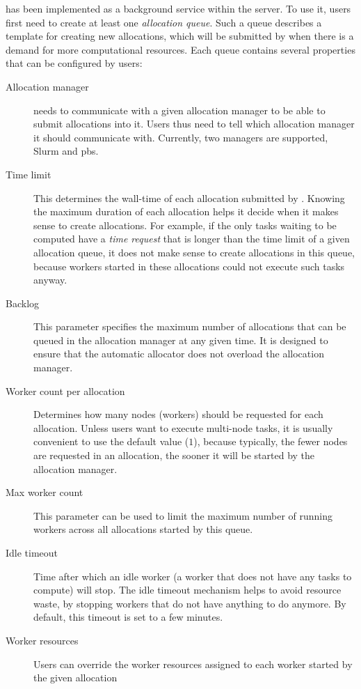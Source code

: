 \Autoalloc{} has been implemented as a background service within the
\hyperqueue{} server. To use it, users first need to create at least one
\emph{allocation queue}. Such a queue describes a template for creating new allocations, which will
be submitted by \hq{} when there is a demand for more computational resources.
Each queue contains several properties that can be configured by users:

\begin{description}
	\item[Allocation manager] \Autoalloc{} needs to communicate with a given allocation manager
		to be able to submit allocations into it. Users thus need to tell \hq{} which
		allocation manager it should communicate with. Currently, two managers are supported, Slurm and
		\gls{pbs}.
	\item[Time limit] This determines the wall-time of each allocation submitted by \autoalloc{}. Knowing the
		maximum duration of each allocation helps it decide when it makes sense to create allocations. For
		example, if the only tasks waiting to be computed have a \emph{time request} that is longer than
		the time limit of a given allocation queue, it does not make sense to create allocations in this
		queue, because workers started in these allocations could not execute such tasks anyway.
	\item[Backlog] This parameter specifies the maximum number of allocations that can be queued in the allocation
		manager at any given time. It is designed to ensure that the automatic allocator does not overload
		the allocation manager.
	\item[Worker count per allocation] Determines how many nodes (workers) should be requested for each allocation. Unless users want to
		execute multi-node tasks, it is usually convenient to use the default value
		($1$), because typically, the fewer nodes are requested in an allocation, the
		sooner it will be started by the allocation manager.
	\item[Max worker count] This parameter can be used to limit the maximum number of running workers across all allocations
		started by this queue.
	\item[Idle timeout] Time after which an idle worker (a worker that does not have any tasks to compute) will stop. The
		idle timeout mechanism helps to avoid resource waste, by stopping workers that do not have anything
		to do anymore. By default, this timeout is set to a few minutes.
	\item[Worker resources] Users can override the worker resources assigned to each worker started by the given allocation

\end{description}

